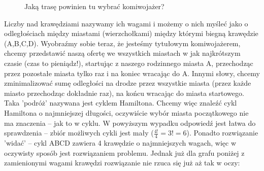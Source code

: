 \documentclass[a4paper]{article}
\theoremstyle{defn}
\theoremstyle{theorem}
\theoremstyle{lemma}
\theoremstyle{cor}
\theoremstyle{fact}
\begin{document}
\begin{figure}[h]
\caption{Jaką trasę powinien tu wybrać komiwojażer?}
\end{figure}

Liczby nad krawędziami nazywamy ich wagami i możemy o nich myśleć jako o odległościach między miastami (wierzchołkami) między którymi biegną krawędzie (A,B,C,D). Wyobraźmy sobie teraz, że jesteśmy tytułowym komiwojażerem, chcemy przedstawić naszą ofertę we wszystkich miastach w jak najkrótszym czasie (czas to pieniądz!), startując z naszego rodzinnego miasta A, przechodząc przez pozostałe miasta tylko raz i na koniec wracając do A. Innymi słowy, chcemy zminimalizować sumę odległości na drodze przez wszystkie miasta (przez każde miasto przechodząc dokładnie raz), na końcu wracając do miasta startowego. Taka 'podróż' nazywana jest cyklem Hamiltona. Chcemy więc znaleźć cykl Hamiltona o najmniejszej długości, oczywiście wybór miasta początkowego nie ma znaczenia – jak to w cyklu. W powyższym wypadku odpowiedź jest łatwa do sprawdzenia – zbiór możliwych cykli jest mały ($\frac{4!}{4} = 3! = 6$). Ponadto rozwiązanie 'widać' – cykl ABCD zawiera 4 krawędzie o najmniejszych wagach, więc w oczywisty sposób jest rozwiązaniem problemu. Jednak już dla grafu poniżej z zamienionymi wagami krawędzi rozwiązanie nie rzuca się już aż tak w oczy:\\\\\\\\\\
\end{document}

